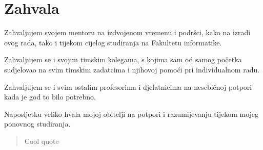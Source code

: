 \chapter*{Zahvala}
Zahvaljujem svojem mentoru  na izdvojenom vremenu i podršci, kako na izradi ovog rada, tako i tijekom cijelog studiranja na Fakultetu informatike.


Zahvaljujem se i svojim timskim kolegama,  s kojima sam od samog početka sudjelovao na svim timskim zadatcima i njihovoj pomoći pri individualnom radu. 


Zahvaljujem se i svim ostalim profesorima i djelatnicima  na nesebičnoj potpori kada je god to bilo potrebno.


Naposljetku veliko hvala mojoj obitelji na potpori i razumijevanju tijekom mojeg ponovnog studiranja.


\vspace*{2cm}

\begin{quotation}
Cool quote
\end{quotation}